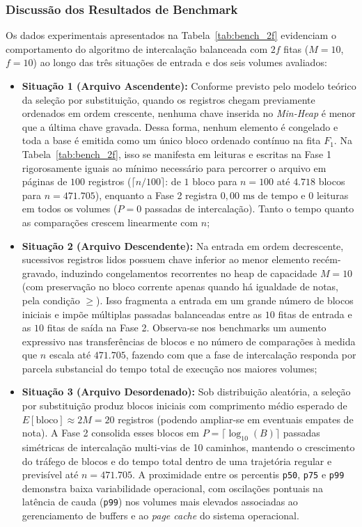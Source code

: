 \documentclass[12pt,a4paper]{article}
\begin{document}
\subsubsection{Discussão dos Resultados de Benchmark}
Os dados experimentais apresentados na Tabela~\ref{tab:bench_2f} evidenciam o comportamento do algoritmo de intercalação balanceada com $2f$ fitas ($M = 10$, $f = 10$) ao longo das três situações de entrada e dos seis volumes avaliados:
\begin{itemize}
    \item \textbf{Situação 1 (Arquivo Ascendente):} Conforme previsto pelo modelo teórico da seleção por substituição, quando os registros chegam previamente ordenados em ordem crescente, nenhuma chave inserida no \textit{Min-Heap} é menor que a última chave gravada. Dessa forma, nenhum elemento é congelado e toda a base é emitida como um único bloco ordenado contínuo na fita $F_1$. Na Tabela~\ref{tab:bench_2f}, isso se manifesta em leituras e escritas na Fase 1 rigorosamente iguais ao mínimo necessário para percorrer o arquivo em páginas de $100$ registros ($\lceil n / 100 \rceil$: de $1$ bloco para $n = 100$ até $4.718$ blocos para $n = 471.705$), enquanto a Fase 2 registra $0{,}00\text{ ms}$ de tempo e $0$ leituras em todos os volumes ($P = 0$ passadas de intercalação). Tanto o tempo quanto as comparações crescem linearmente com $n$;
    \item \textbf{Situação 2 (Arquivo Descendente):} Na entrada em ordem decrescente, sucessivos registros lidos possuem chave inferior ao menor elemento recém-gravado, induzindo congelamentos recorrentes no heap de capacidade $M = 10$ (com preservação no bloco corrente apenas quando há igualdade de notas, pela condição $\ge$). Isso fragmenta a entrada em um grande número de blocos iniciais e impõe múltiplas passadas balanceadas entre as $10$ fitas de entrada e as $10$ fitas de saída na Fase 2. Observa-se nos benchmarks um aumento expressivo nas transferências de blocos e no número de comparações à medida que $n$ escala até $471.705$, fazendo com que a fase de intercalação responda por parcela substancial do tempo total de execução nos maiores volumes;
    \item \textbf{Situação 3 (Arquivo Desordenado):} Sob distribuição aleatória, a seleção por substituição produz blocos iniciais com comprimento médio esperado de $E[\text{bloco}] \approx 2M = 20$ registros (podendo ampliar-se em eventuais empates de nota). A Fase 2 consolida esses blocos em $P = \lceil \log_{10}(B) \rceil$ passadas simétricas de intercalação multi-vias de 10 caminhos, mantendo o crescimento do tráfego de blocos e do tempo total dentro de uma trajetória regular e previsível até $n = 471.705$. A proximidade entre os percentis \texttt{p50}, \texttt{p75} e \texttt{p99} demonstra baixa variabilidade operacional, com oscilações pontuais na latência de cauda (\texttt{p99}) nos volumes mais elevados associadas ao gerenciamento de buffers e ao \textit{page cache} do sistema operacional.
\end{itemize}
\end{document}
